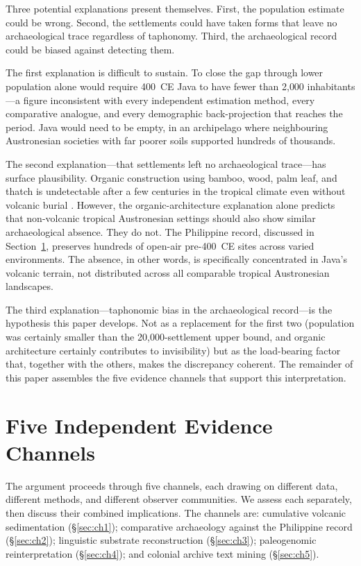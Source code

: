 \documentclass[12pt,a4paper]{article}
\begin{document}
Three potential explanations present themselves. First, the population estimate could be wrong. Second, the settlements could have taken forms that leave no archaeological trace regardless of taphonomy. Third, the archaeological record could be biased against detecting them.

The first explanation is difficult to sustain. To close the gap through lower population alone would require 400~CE Java to have fewer than 2{,}000 inhabitants---a figure inconsistent with every independent estimation method, every comparative analogue, and every demographic back-projection that reaches the period. Java would need to be empty, in an archipelago where neighbouring Austronesian societies with far poorer soils supported hundreds of thousands.

The second explanation---that settlements left no archaeological trace---has surface plausibility. Organic construction using bamboo, wood, palm leaf, and thatch is undetectable after a few centuries in the tropical climate even without volcanic burial \citep{erasmus2005}. However, the organic-architecture explanation alone predicts that non-volcanic tropical Austronesian settings should also show similar archaeological absence. They do not. The Philippine record, discussed in Section~\ref{sec:channels}, preserves hundreds of open-air pre-400~CE sites across varied environments. The absence, in other words, is specifically concentrated in Java's volcanic terrain, not distributed across all comparable tropical Austronesian landscapes.

The third explanation---taphonomic bias in the archaeological record---is the hypothesis this paper develops. Not as a replacement for the first two (population was certainly smaller than the 20{,}000-settlement upper bound, and organic architecture certainly contributes to invisibility) but as the load-bearing factor that, together with the others, makes the discrepancy coherent. The remainder of this paper assembles the five evidence channels that support this interpretation.


\section{Five Independent Evidence Channels}
\label{sec:channels}

The argument proceeds through five channels, each drawing on different data, different methods, and different observer communities. We assess each separately, then discuss their combined implications. The channels are: cumulative volcanic sedimentation (\S\ref{sec:ch1}); comparative archaeology against the Philippine record (\S\ref{sec:ch2}); linguistic substrate reconstruction (\S\ref{sec:ch3}); paleogenomic reinterpretation (\S\ref{sec:ch4}); and colonial archive text mining (\S\ref{sec:ch5}).
\end{document}
